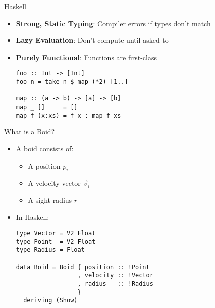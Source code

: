 \documentclass{beamer}
\begin{document}
\begin{frame}[fragile]
\huge{Haskell}\normalsize
\begin{itemize}
    \item \textbf{Strong, Static Typing}: Compiler errors if types don't match
    \item \textbf{Lazy Evaluation}: Don't compute until asked to
    \item \textbf{Purely Functional}: Functions are first-class
\vspace{1cm}
        \begin{verbatim}
foo :: Int -> [Int]
foo n = take n $ map (*2) [1..]

map :: (a -> b) -> [a] -> [b]
map _ []     = []
map f (x:xs) = f x : map f xs
        \end{verbatim}
\end{itemize}
\end{frame}

\begin{frame}[fragile]
    \huge{What is a Boid?}\normalsize
    \begin{itemize}
        \item A boid consists of:
        \begin{itemize}
            \item A position $p_i$
            \item A velocity vector $\vec{v}_i$
            \item A sight radius $r$
        \end{itemize}
        \item<2-> In Haskell:
        \begin{verbatim}
type Vector = V2 Float
type Point  = V2 Float
type Radius = Float

data Boid = Boid { position :: !Point
                 , velocity :: !Vector
                 , radius   :: !Radius
                 }
  deriving (Show)
        \end{verbatim}
    \end{itemize}
\end{frame}
\end{document}
